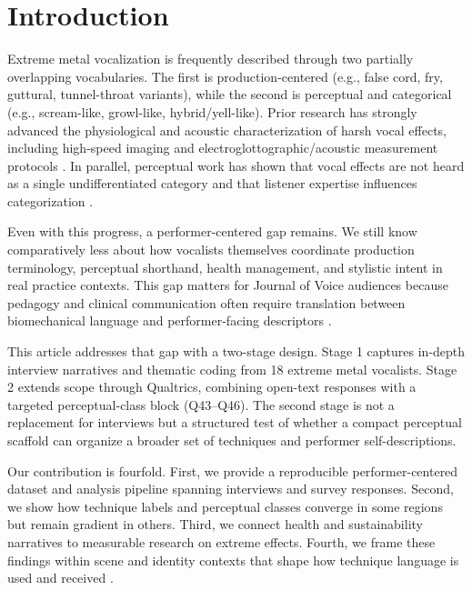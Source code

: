 \documentclass{article}
\begin{document}
\section{Introduction}
Extreme metal vocalization is frequently described through two partially overlapping vocabularies.
The first is production-centered (e.g., false cord, fry, guttural, tunnel-throat variants), while the second is perceptual and categorical (e.g., scream-like, growl-like, hybrid/yell-like).
Prior research has strongly advanced the physiological and acoustic characterization of harsh vocal effects, including high-speed imaging and electroglottographic/acoustic measurement protocols \parencite{Eckers2009Growling,Lee2025VocalDistortion,Aaen2024ExtremeVocalEffects,Zheng2009FalseVocalFolds,Guzman2018MetalSinging,blomgren1998vocalfry}.
In parallel, perceptual work has shown that vocal effects are not heard as a single undifferentiated category and that listener expertise influences categorization \parencite{Pinto2023VocalEffects,Anikin2025AcousticRoughness}.

Even with this progress, a performer-centered gap remains.
We still know comparatively less about how vocalists themselves coordinate production terminology, perceptual shorthand, health management, and stylistic intent in real practice contexts.
This gap matters for Journal of Voice audiences because pedagogy and clinical communication often require translation between biomechanical language and performer-facing descriptors \parencite{sadolin1996rough,sadolin2000complete,sadolin2012effects}.

This article addresses that gap with a two-stage design.
Stage 1 captures in-depth interview narratives and thematic coding from 18 extreme metal vocalists.
Stage 2 extends scope through Qualtrics, combining open-text responses with a targeted perceptual-class block (Q43--Q46).
The second stage is not a replacement for interviews but a structured test of whether a compact perceptual scaffold can organize a broader set of techniques and performer self-descriptions.

Our contribution is fourfold.
First, we provide a reproducible performer-centered dataset and analysis pipeline spanning interviews and survey responses.
Second, we show how technique labels and perceptual classes converge in some regions but remain gradient in others.
Third, we connect health and sustainability narratives to measurable research on extreme effects.
Fourth, we frame these findings within scene and identity contexts that shape how technique language is used and received \parencite{Herbst2017VoiceOfAnarchy,Wallmark2018SoundOfEvil,Ribaldini2019Terminology,Sharman2015AngerProcessing}.
\end{document}
